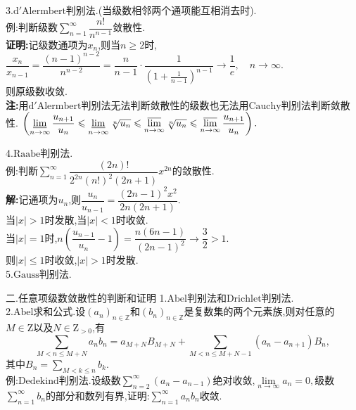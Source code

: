 \documentclass[UTF8]{ctexbeamer}
\begin{document}
    \begin{frame}
        3.$\mathrm{d'Alermbert}$判别法.(当级数相邻两个通项能互相消去时).
        \\例:判断级数$\sum\limits_{n=1}^{\infty}\dfrac{n!}{n^{n-1}}$敛散性.
        \pause
        \\\textbf{证明:}记级数通项为$x_n$,则当$n\geqslant 2$时,
        \\$\dfrac{x_n}{x_{n-1}}=\dfrac{(n-1)^{n-2}}{n^{n-2}}=\dfrac{n}{n-1}\cdot \dfrac{1}{\left(1+\frac{1}{n-1}\right)^{n-1}}\longrightarrow \dfrac{1}{e},\quad n\longrightarrow \infty$.
        \\则原级数收敛.
        \pause
        \\\textbf{注:}用$\mathrm{d'Alermbert}$判别法无法判断敛散性的级数也无法用$\mathrm{Cauchy}$判别法判断敛散性.
        $\left(\varliminf\limits_{n\to\infty}\dfrac{u_{n+1}}{u_n}\leqslant \varliminf\limits_{n\to\infty}\sqrt[n]{u_n}\leqslant\varlimsup\limits_{n\to\infty}\sqrt[n]{u_n}\leqslant\varlimsup\limits_{n\to\infty}\dfrac{u_{n+1}}{u_n}\right).$
    \end{frame}
    \begin{frame}
        4.$\mathrm{Raabe}$判别法.
        \\例:判断$\sum\limits_{n=1}^{\infty}{\dfrac{(2n)!}{2^{2n}(n!)^2(2n+1)}x^{2n}}$的敛散性.
        \pause
        \\\textbf{解:}记通项为$u_n$,则$\dfrac{u_n}{u_{n-1}}=\dfrac{(2n-1)^2x^2}{2n(2n+1)}$.
        \\当$|x|>1$时发散,当$|x|<1$时收敛.
        \\当$|x|=1$时,$n\left(\dfrac{u_{n-1}}{u_n}-1\right)=\dfrac{n(6n-1)}{(2n-1)^2}\longrightarrow \dfrac{3}{2}>1$.
        \\则$|x|\leqslant 1$时收敛,$|x|>1$时发散.
        \\5.$\mathrm{Gauss}$判别法.
    \end{frame}
    \begin{frame}{二.任意项级数敛散性的判断和证明}
        1.$\mathrm{Abel}$判别法和$\mathrm{Drichlet}$判别法.
        \\2.$\mathrm{Abel}$求和公式.设$(a_n)_{n\in\mathbb{Z}}$和$(b_n)_{n\in\mathbb{Z}}$是复数集的两个元素族,则对任意的$M\in\mathrm{Z}$以及$N\in\mathrm{Z}_{>0}$,有
        $$\sum_{M<n\leqslant M+N}a_nb_n=a_{M+N}B_{M+N}+\sum_{M<n\leqslant M+N-1}(a_n-a_{n+1})B_n,$$
        其中$B_n=\sum\limits_{M<k\leqslant n}b_k$.
        \\例:$\mathrm{Dedekind}$判别法.设级数$\sum\limits_{n=2}^{\infty}(a_n-a_{n-1})$绝对收敛,$\lim\limits_{n\to\infty}a_n=0,$级数$\sum\limits_{n=1}^{\infty}b_n$的部分和数列有界,证明:$\sum\limits_{n=1}^{\infty}a_nb_n$收敛.
    \end{frame}
\end{document}
